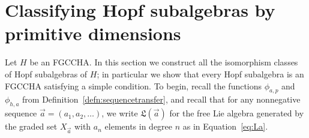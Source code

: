 \documentclass[11pt]{amsart}
\theoremstyle{definition}
\numberwithin{equation}{section}
\def\CC{{\mathbb C}}
\newcommand{\FGCCHA}{\textsf{FGCCHA}\xspace}
\newcommand{\mike}[1]{\todo[size=\tiny,color=green!30]{#1 \\ \hfill --- Mike}}
\newcommand{\lucas}[1]{\todo[size=\tiny,color=red!50]{#1 \\ \hfill --- Lucas}}
\begin{document}
%



\section{Classifying Hopf subalgebras by primitive dimensions}
\label{sec:subalgebras}

Let $H$ be an \FGCCHA.  
In this section we construct all the isomorphism classes of Hopf subalgebras of $H$; in particular we show that every Hopf subalgebra is an \FGCCHA satisfying a simple condition.
To begin, recall the functions $\phi_{a, p}$ and $\phi_{h, a}$ from Definition~\ref{defn:sequencetransfer}, and recall that for any nonnegative sequence $\vec{a} = (a_{1}, a_{2}, \ldots)$, we write $\mathfrak{L}(\vec{a})$ for the free Lie algebra generated by the graded set $X_{\vec{a}}$ with $a_{n}$ elements in degree $n$ as in Equation~\eqref{eq:La}.
\end{document}
